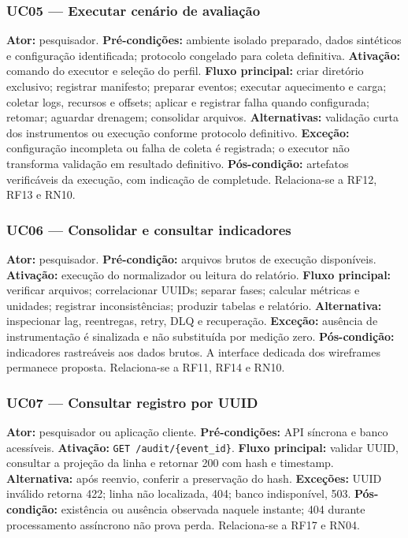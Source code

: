 \subsubsection{UC05 --- Executar cenário de avaliação}
\textbf{Ator:} pesquisador.
\textbf{Pré-condições:} ambiente isolado preparado, dados sintéticos e configuração identificada; protocolo congelado para coleta definitiva.
\textbf{Ativação:} comando do executor e seleção do perfil.
\textbf{Fluxo principal:} criar diretório exclusivo; registrar manifesto; preparar eventos; executar aquecimento e carga; coletar logs, recursos e offsets; aplicar e registrar falha quando configurada; retomar; aguardar drenagem; consolidar arquivos.
\textbf{Alternativas:} validação curta dos instrumentos ou execução conforme protocolo definitivo.
\textbf{Exceção:} configuração incompleta ou falha de coleta é registrada; o executor não transforma validação em resultado definitivo.
\textbf{Pós-condição:} artefatos verificáveis da execução, com indicação de completude. Relaciona-se a RF12, RF13 e RN10.

\subsubsection{UC06 --- Consolidar e consultar indicadores}
\textbf{Ator:} pesquisador.
\textbf{Pré-condição:} arquivos brutos de execução disponíveis.
\textbf{Ativação:} execução do normalizador ou leitura do relatório.
\textbf{Fluxo principal:} verificar arquivos; correlacionar UUIDs; separar fases; calcular métricas e unidades; registrar inconsistências; produzir tabelas e relatório.
\textbf{Alternativa:} inspecionar lag, reentregas, retry, DLQ e recuperação.
\textbf{Exceção:} ausência de instrumentação é sinalizada e não substituída por medição zero.
\textbf{Pós-condição:} indicadores rastreáveis aos dados brutos. A interface dedicada dos wireframes permanece proposta. Relaciona-se a RF11, RF14 e RN10.

\subsubsection{UC07 --- Consultar registro por UUID}
\textbf{Ator:} pesquisador ou aplicação cliente.
\textbf{Pré-condições:} API síncrona e banco acessíveis.
\textbf{Ativação:} \texttt{GET /audit/\{event\_id\}}.
\textbf{Fluxo principal:} validar UUID, consultar a projeção da linha e retornar 200 com hash e timestamp.
\textbf{Alternativa:} após reenvio, conferir a preservação do hash.
\textbf{Exceções:} UUID inválido retorna 422; linha não localizada, 404; banco indisponível, 503.
\textbf{Pós-condição:} existência ou ausência observada naquele instante; 404 durante processamento assíncrono não prova perda. Relaciona-se a RF17 e RN04.

